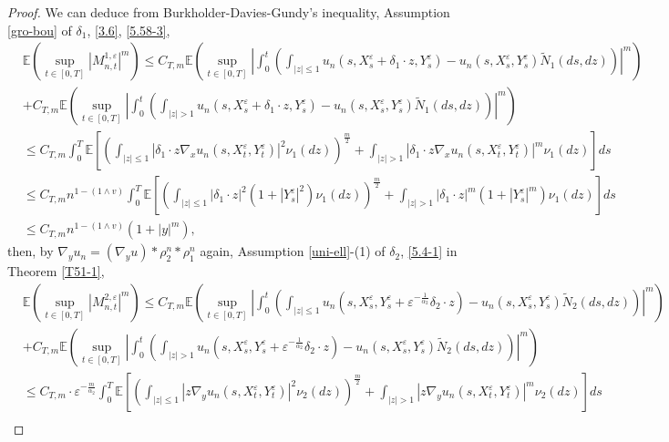 \documentclass[11pt,reqno]{amsart}
\numberwithin{equation}{section}
\newcommand{\de}{\delta}
\begin{document}
\begin{proof}
We can deduce from Burkholder-Davies-Gundy's inequality, Assumption \ref{gro-bou}  of $\de_1$, \eqref{3.6}, \eqref{5.58-3}, 	\begin{align}
	&\mathbb{E}\left( \sup_{t\in [0,T]}|M_{n,t}^{1,\varepsilon}|^{m}\right)\nonumber\leq C_{T,m}
	\mathbb{E}\left(\sup_{t\in [0,T]}\left| \int_{0}^{t}\left(\int_{|z|\leq 1}u_{n}(s,X_{s}^{\varepsilon}+\de_1\cdot z,Y_{s}^{\varepsilon})-u_{n}(s,X_{s}^{\varepsilon},Y_{s}^{\varepsilon})\tilde{N}_{1}(ds,dz) \right)\right| ^{m}\right)\nonumber\\
	&+ C_{T,m}
	\mathbb{E}\left(\sup_{t\in [0,T]}\left| \int_{0}^{t}\left(\int_{|z|> 1}u_{n}(s,X_{s}^{\varepsilon}+\de_1\cdot  z,Y_{s}^{\varepsilon})-u_{n}(s,X_{s}^{\varepsilon},Y_{s}^{\varepsilon})\tilde{N}_{1}(ds,dz) \right)\right| ^{m}\right)\nonumber\\
	&\leq  C_{T,m}  \int_{0}^{T}\mathbb{E}\left[\left(\int_{|z|\leq 1}|\de_1\cdot z\nabla_{x} u_{n}(s,X_{t}^{\varepsilon},Y_{t}^{\varepsilon})|^{2}\nu_{1}(dz) \right)^{\frac{m}{2}}+\int_{|z|> 1}|\de_1\cdot z\nabla_{x} u_{n}(s,X_{t}^{\varepsilon},Y_{t}^{\varepsilon})|^{m}\nu_{1}(dz)\right]ds\nonumber \\
	&\leq C_{T,m}n^{1-(1\wedge v)}  \int_{0}^{T}\mathbb{E}\left[\left(\int_{|z|\leq 1}|\de_1\cdot z|^{2}(1+|Y_{s}^{\varepsilon}|^{2})\nu_{1}(dz) \right)^{\frac{m}{2}}+\int_{|z|> 1}|\de_1\cdot z|^{m}(1+|Y_{s}^{\varepsilon}|^{m})\nu_{1}(dz) \right]ds\nonumber\\
	& \leq C_{T,m}n^{1-(1\wedge v)}(1+|y|^{m}),\label{5.53}
\end{align}
then, by $ \nabla_{y}u_{n}=(\nabla_{y}u)\ast\rho_{2}^{n}\ast\rho_{1}^{n}$ again, Assumption \ref{uni-ell}-(1)  of $\de_2$,  \eqref{5.4-1} in Theorem \ref{T51-1},
\begin{align}
&\mathbb{E}\left( \sup_{t\in [0,T]}|M_{n,t}^{2,\varepsilon}|^{m}\right)\leq C_{T,m}
\mathbb{E}\left(\sup_{t\in [0,T]}\left| \int_{0}^{t}\left(\int_{|z|\leq 1}u_{n}(s,X_{s}^{\varepsilon},Y_{s}^{\varepsilon}+\varepsilon^{-\frac{1}{\alpha_{2}}}\de_2\cdot z)-u_{n}(s,X_{s}^{\varepsilon},Y_{s}^{\varepsilon})\tilde{N}_{2}(ds,dz) \right)\right| ^{m}\right) \nonumber\\	&+ C_{T,m}\mathbb{E}\left(\sup_{t\in [0,T]}\left| \int_{0}^{t}\left(\int_{|z|> 1}u_{n}(s,X_{s}^{\varepsilon},Y_{s}^{\varepsilon}+\varepsilon^{-\frac{1}{\alpha_{2}}}\de_2\cdot z)-u_{n}(s,X_{s}^{\varepsilon},Y_{s}^{\varepsilon})\tilde{N}_{2}(ds,dz) \right)\right| ^{m}\right) \nonumber\\
&\leq  C_{T,m}\cdot \varepsilon^{-\frac{m}{\alpha_{2}}} \int_{0}^{T}\mathbb{E}\left[\left(\int_{|z|\leq 1}| z\nabla_{y} u_{n}(s,X_{t}^{\varepsilon},Y_{t}^{\varepsilon})|^{2}\nu_{2}(dz) \right)^{\frac{m}{2}}+\int_{|z|> 1}| z\nabla_{y} u_{n}(s,X_{t}^{\varepsilon},Y_{t}^{\varepsilon})|^{m}\nu_{2}(dz) \right]ds \nonumber\\

\end{align}
\end{proof}
\end{document}

